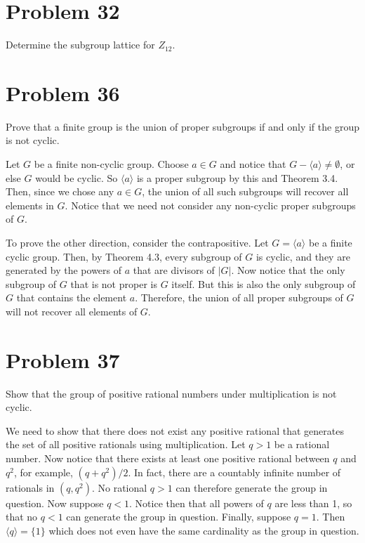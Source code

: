 \documentclass{article}
\begin{document}
\section*{Problem 32}

Determine the subgroup lattice for $Z_{12}$.

\section*{Problem 36}

Prove that a finite group is the union of proper subgroups if and only if the group is not cyclic.

Let $G$ be a finite non-cyclic group.  Choose $a\in G$ and notice that
$G-\langle a\rangle\neq\emptyset$, or else $G$ would be cyclic.
So $\langle a\rangle$ is a proper subgroup by this and Theorem 3.4.  Then,
since we chose any $a\in G$,
the union of all such subgroups will recover all elements in $G$.
Notice that we need not consider any
non-cyclic proper subgroups of $G$.

To prove the other direction, consider the contrapositive.  Let $G=\langle a\rangle$
be a finite cyclic group.
Then, by Theorem 4.3, every subgroup of $G$ is cyclic, and they are generated by
the powers of $a$
that are divisors of $|G|$.  Now notice that the only subgroup of $G$ that is not proper
is $G$ itself.  But this is also the only subgroup of $G$ that contains the element $a$.
Therefore, the union of all proper subgroups of $G$ will not recover all elements of $G$.

\section*{Problem 37}

Show that the group of positive rational numbers under multiplication
is not cyclic.

We need to show that there does not exist any positive rational that generates
the set of all positive rationals using multiplication.  Let $q>1$ be a rational
number.  Now notice that there exists at least one positive
rational between $q$ and $q^2$, for example, $(q+q^2)/2$.  In fact, there are a countably
infinite number of rationals in $(q,q^2)$.
No rational $q>1$ can therefore generate the group in question.
Now suppose $q<1$.  Notice then that all powers of $q$ are less than 1, so that
no $q<1$ can generate the group in question.
Finally, suppose $q=1$.  Then $\langle q\rangle=\{1\}$ which does not even have
the same cardinality as the group in question.
\end{document}
